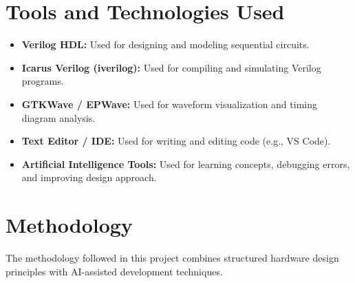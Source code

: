 \documentclass[12pt]{article}
\begin{document}
\section*{Tools and Technologies Used}

\begin{itemize}
    \item \textbf{Verilog HDL:} Used for designing and modeling sequential circuits.
    
    \item \textbf{Icarus Verilog (iverilog):} Used for compiling and simulating Verilog programs.
    
    \item \textbf{GTKWave / EPWave:} Used for waveform visualization and timing diagram analysis.
    
    \item \textbf{Text Editor / IDE:} Used for writing and editing code (e.g., VS Code).
    
    \item \textbf{Artificial Intelligence Tools:} Used for learning concepts, debugging errors, and improving design approach.
\end{itemize}

\section*{Methodology}

The methodology followed in this project combines structured hardware design principles with AI-assisted development techniques.
\end{document}
